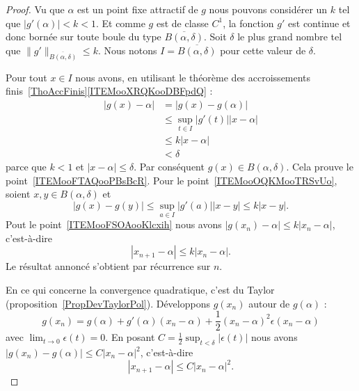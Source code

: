 \begin{proof}
	Vu que \( \alpha\) est un point fixe attractif de \( g\) nous pouvons considérer un \( k\) tel que \( | g'(\alpha) |<k<1\). Et comme \( g\) est de classe \( C^1\), la fonction \( g'\) est continue et donc bornée sur toute boule du type \( \overline{ B(\alpha,\delta) }\). Soit \( \delta\) le plus grand nombre tel que \( \| g' \|_{\overline{ B(\alpha,\delta) }}\leq k\). Nous notons \( I=\overline{ B(\alpha,\delta) } \) pour cette valeur de \( \delta\).

	Pour tout \( x\in I\) nous avons, en utilisant le théorème des accroissements finis~\ref{ThoAccFinis}\ref{ITEMooXRQKooDBFpdQ} :
	\begin{subequations}        \label{SUBEQooYXLHooSCnnRA}
		\begin{align}
			| g(x)-\alpha | & =| g(x)-g(\alpha) |                    \\
			                & \leq\sup_{t\in I}| g'(t) | |x-\alpha | \\
			                & \leq k| x-\alpha |                     \\
			                & <\delta
		\end{align}
	\end{subequations}
	parce que \( k<1\) et \(| x-\alpha |\leq \delta\). Par conséquent \( g(x)\in B(\alpha,\delta)\). Cela prouve le point~\ref{ITEMooFTAQooPBsBcR}. Pour le point~\ref{ITEMooOQKMooTRSvUo}, soient \( x,y\in B(\alpha,\delta)\) et
	\begin{equation}
		| g(x)-g(y) |\leq \sup_{a\in I}| g'(a) | |x-y |\leq k| x-y |.
	\end{equation}
	Pout le point~\ref{ITEMooFSOAooKlcxih} nous avons \( | g(x_n)-\alpha |\leq k| x_n-\alpha |\), c'est-à-dire
	\begin{equation}
		| x_{n+1}-\alpha |\leq k| x_n-\alpha |.
	\end{equation}
	Le résultat annoncé s'obtient par récurrence sur \( n\).

	En ce qui concerne la convergence quadratique, c'est du Taylor (proposition~\ref{PropDevTaylorPol}). Développons \( g(x_n)\) autour de \( g(\alpha)\) :
	\begin{equation}
		g(x_n)=g(\alpha)+g'(\alpha)(x_n-\alpha)+\frac{ 1 }{2}(x_n-\alpha)^2\epsilon(x_n-\alpha)
	\end{equation}
	avec \( \lim_{t\to 0} \epsilon(t)=0\). En posant \( C=\frac{ 1 }{2}\sup_{t<\delta}| \epsilon(t) | \) nous avons \( | g(x_n)-g(\alpha) |\leq C|x_n-\alpha  |^2\), c'est-à-dire
	\begin{equation}
		| x_{n+1}-\alpha |\leq C| x_n-\alpha |^2.
	\end{equation}
\end{proof}

